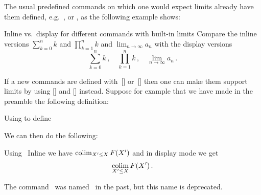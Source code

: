 The usual predefined commands on which one would expect limits already have them defined, e.g.\ ,  or , as the following example shows:
\begin{showlatex}{Inline vs.\ display for different commands with built-in limits}
Compare the inline versions $\sum_{k=0}^n k$ and $\prod_{k=1}^n k$ and $\lim_{n \to \infty} a_n$ with the display versions
\[
  \sum_{k=0}^n k \,,
  \quad
  \prod_{k=1}^n k \,,
  \quad
  \lim_{n \to \infty} a_n \,.
\]
\end{showlatex}
If a new commands are defined with~[\comname] or~[\comname] then one can make them support limits by using [\comname] and [\comname] instead.
Suppose for example that we have made in the preamble the following definition:
\begin{showcode}{Using  to define~}
\DeclareMathOperator*{\colim}{colim}
\end{showcode}
We can then do the following:
\begin{showlatex}{Using~}
Inline we have $\colim_{X' \leq X} F(X')$ and in display mode we get
\[
  \colim_{X' \leq X} F(X') \,.
\]
\end{showlatex}
The command~ was named~ in the past, but this name is deprecated.




